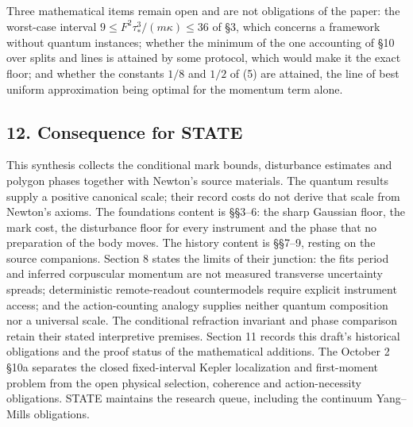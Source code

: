 \documentclass[11pt,a4paper]{article}
\begin{document}
Three mathematical items remain open and are not obligations of the
paper: the worst-case interval \(9\le F^2\tau_*^3/(m\kappa)\le36\) of
§3, which concerns a framework without quantum instances; whether the
minimum of the one accounting of §10 over splits and lines is attained
by some protocol, which would make it the exact floor; and whether the
constants \(1/8\) and \(1/2\) of (5) are attained, the line of best
uniform approximation being optimal for the momentum term alone.

\hypertarget{consequence-for-state}{%
\subsection{12. Consequence for STATE}\label{consequence-for-state}}

This synthesis collects the conditional mark bounds, disturbance
estimates and polygon phases together with Newton's source materials.
The quantum results supply a positive canonical scale; their record
costs do not derive that scale from Newton's axioms. The foundations
content is §§3--6: the sharp Gaussian floor, the mark cost, the
disturbance floor for every instrument and the phase that no preparation
of the body moves. The history content is §§7--9, resting on the source
companions. Section 8 states the limits of their junction: the fits
period and inferred corpuscular momentum are not measured transverse
uncertainty spreads; deterministic remote-readout countermodels require
explicit instrument access; and the action-counting analogy supplies
neither quantum composition nor a universal scale. The conditional
refraction invariant and phase comparison retain their stated
interpretive premises. Section 11 records this draft's historical
obligations and the proof status of the mathematical additions. The
October 2 §10a separates the closed fixed-interval Kepler localization
and first-moment problem from the open physical selection, coherence and
action-necessity obligations. STATE maintains the research queue,
including the continuum Yang--Mills obligations.
\end{document}
